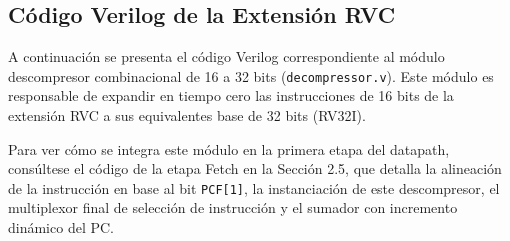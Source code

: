 \documentclass[12pt, a4paper]{article}
\begin{document}
\subsection{Código Verilog de la Extensión RVC}
A continuación se presenta el código Verilog correspondiente al módulo descompresor combinacional de 16 a 32 bits (\texttt{decompressor.v}). Este módulo es responsable de expandir en tiempo cero las instrucciones de 16 bits de la extensión RVC a sus equivalentes base de 32 bits (RV32I).

Para ver cómo se integra este módulo en la primera etapa del datapath, consúltese el código de la etapa Fetch en la Sección 2.5, que detalla la alineación de la instrucción en base al bit \texttt{PCF[1]}, la instanciación de este descompresor, el multiplexor final de selección de instrucción y el sumador con incremento dinámico del PC.
\end{document}
